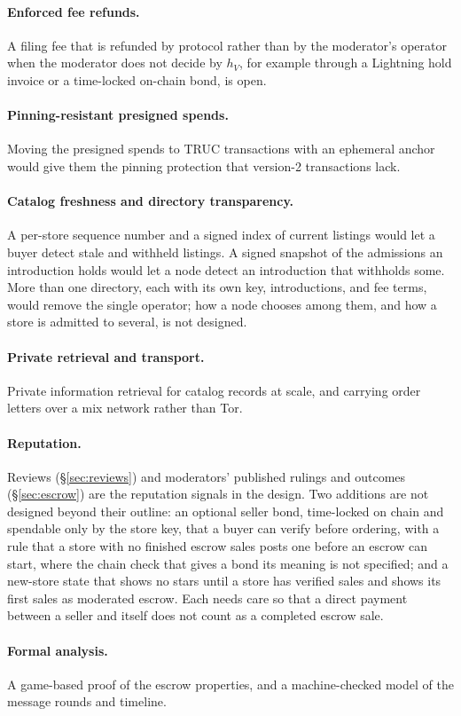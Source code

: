 \paragraph{Enforced fee refunds.} A filing fee that is refunded by protocol rather than by the moderator's operator when the moderator does not decide by $h_V$, for example through a Lightning hold invoice or a time-locked on-chain bond, is open.

\paragraph{Pinning-resistant presigned spends.} Moving the presigned spends to TRUC transactions with an ephemeral anchor would give them the pinning protection that version-2 transactions lack.

\paragraph{Catalog freshness and directory transparency.} A per-store sequence number and a signed index of current listings would let a buyer detect stale and withheld listings. A signed snapshot of the admissions an introduction holds would let a node detect an introduction that withholds some. More than one directory, each with its own key, introductions, and fee terms, would remove the single operator; how a node chooses among them, and how a store is admitted to several, is not designed.

\paragraph{Private retrieval and transport.} Private information retrieval for catalog records at scale, and carrying order letters over a mix network rather than Tor.

\paragraph{Reputation.} Reviews (\S\ref{sec:reviews}) and moderators' published rulings and outcomes (\S\ref{sec:escrow}) are the reputation signals in the design. Two additions are not designed beyond their outline: an optional seller bond, time-locked on chain and spendable only by the store key, that a buyer can verify before ordering, with a rule that a store with no finished escrow sales posts one before an escrow can start, where the chain check that gives a bond its meaning is not specified; and a new-store state that shows no stars until a store has verified sales and shows its first sales as moderated escrow. Each needs care so that a direct payment between a seller and itself does not count as a completed escrow sale.

\paragraph{Formal analysis.} A game-based proof of the escrow properties, and a machine-checked model of the message rounds and timeline.

